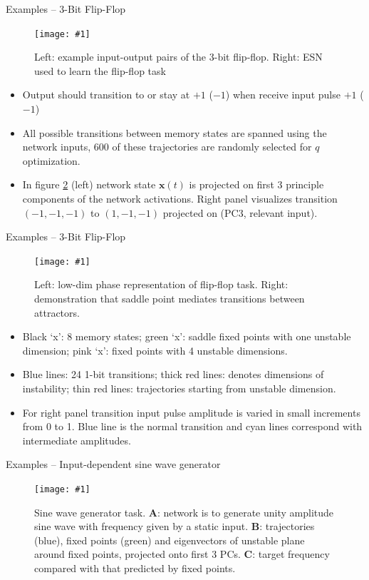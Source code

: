 \documentclass[9pt]{beamer}
\newcommand{\picHereWidth}[4] { %
    \begin{figure}[htp] %
        \centering
        \texttt{[image: \#1]} %
        \caption{#2} %
        \label{#3}
    \end{figure} %
}
\begin{document}
\begin{frame}{Examples -- 3-Bit Flip-Flop}
    \picHereWidth{../images/sussilo13-fig2_flipflop.png}{Left: example input-output pairs of the 3-bit flip-flop. Right: ESN used to learn the flip-flop task}{fig:flipflop_model}{0.55\linewidth}
    \begin{itemize}
        \item Output should transition to or stay at $+1$ ($-1$) when receive input pulse $+1$ ($-1$)
        \item All possible transitions between memory states are spanned using the network inputs, 600 of these trajectories are randomly selected for $q$ optimization.
        \item In figure \ref{fig:flipflop_result} (left) network state $\mathbf{x}(t)$ is projected on first 3 principle components of the network activations. Right panel visualizes transition $(-1,-1,-1)$ to $( 1, -1, -1)$ projected on (PC3, relevant input).
    \end{itemize}
\end{frame}

\begin{frame}{Examples -- 3-Bit Flip-Flop}
    \picHereWidth{../images/sussilo13-fig3_flipflop.png}{Left: low-dim phase representation of flip-flop task. Right: demonstration that saddle point mediates transitions between attractors.}{fig:flipflop_result}{0.78\linewidth}
    \begin{itemize}
        \item Black `x': 8 memory states; green `x': saddle fixed points with one unstable dimension; pink `x': fixed points with 4 unstable dimensions.
        \item Blue lines: 24 1-bit transitions; thick red lines: denotes dimensions of instability; thin red lines: trajectories starting from unstable dimension.
        \item For right panel transition input pulse amplitude is varied in small increments from 0 to 1. Blue line is the normal transition and cyan lines correspond with intermediate amplitudes.
    \end{itemize}
\end{frame}

\begin{frame}{Examples -- Input-dependent sine wave generator}
    \picHereWidth{../images/sussilo13-fig4_sinegen.png}{Sine wave generator task. \textbf{A}: network is to generate unity amplitude sine wave with frequency given by a static input. \textbf{B}: trajectories (blue), fixed points (green) and eigenvectors of unstable plane around fixed points, projected onto first 3 PCs. \textbf{C}: target frequency compared with that predicted by fixed points.}{fig:sine_gen}{0.7\linewidth}
\end{frame}
\end{document}

